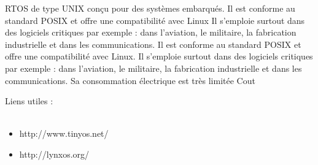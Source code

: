 {RTOS de type UNIX conçu pour des systèmes embarqués. Il est conforme au standard POSIX et offre une compatibilité avec Linux}
{Il s'emploie surtout dans des logiciels critiques par exemple : dans l'aviation, le militaire, la fabrication industrielle et dans les communications.
Il est conforme au standard POSIX et offre une compatibilité avec Linux. Il s'emploie surtout dans des logiciels critiques par exemple : dans l'aviation, le militaire, la fabrication industrielle et dans les communications.}
{Sa consommation électrique est très limitée}
{Cout}
{
}
{
}

Liens utiles : \\~
\begin {itemize}
	\item http://www.tinyos.net/
	\item http://lynxos.org/
\end {itemize}

